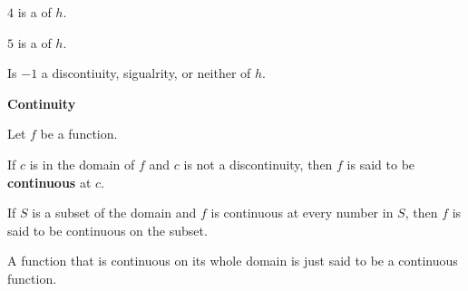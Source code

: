 \documentclass{ximera}
\begin{document}
\begin{example}
\begin{question}
$4$ is a  of $h$.


\end{question}





\begin{question}

$5$ is a  of $h$.


\end{question}





\begin{question}

Is $-1$ a discontiuity, sigualrity, or neither of $h$.

\begin{multipleChoice}
\end{multipleChoice}


\end{question}







\end{example}






\begin{definition} \textbf{\textcolor{green!50!black}{Continuity}} 


Let $f$ be a function. 

If $c$ is in the domain of $f$ and $c$ is not a discontinuity, then $f$ is said to be \textbf{continuous} at $c$. 


If $S$ is a subset of the domain and $f$ is continuous at every number in $S$, then $f$ is said to be continuous on the subset. 

A function that is continuous on its whole domain is just said to be a continuous function. 


\end{definition}
\end{document}
